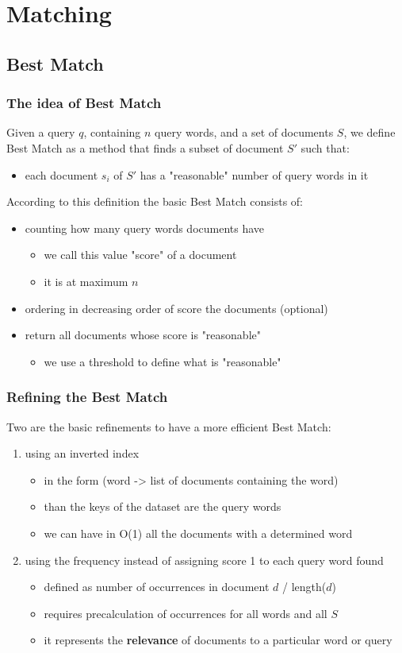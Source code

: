 \documentclass{beamer}
\begin{document}
\section{Matching}
\subsection{Best Match}
\begin{frame}
\frametitle{The idea of Best Match}
Given a query $q$, containing $n$ query words, and a set of documents $S$, we define Best Match as a method that finds a subset of document $S'$ such that:
\begin{itemize}
	\item each document $s_i$ of $S'$ has a "reasonable" number of query words in it
\end{itemize}
\medskip
According to this definition the basic Best Match consists of:
\begin{itemize}
	\item counting how many query words documents have
	\begin{itemize}
		\item we call this value "score" of a document
		\item it is at maximum $n$
	\end{itemize}
	\item ordering in decreasing order of score the documents (optional)
	\item return all documents whose score is "reasonable"
	\begin{itemize}
		\item we use a threshold to define what is "reasonable"
	\end{itemize}
\end{itemize}
\end{frame}
\begin{frame}
\frametitle{Refining the Best Match}
Two are the basic refinements to have a more efficient Best Match:
\begin{enumerate}
	\item using an inverted index
	\begin{itemize}
		\item in the form (word -> list of documents containing the word)
		\item than the keys of the dataset are the query words
		\item we can have in O(1) all the documents with a determined word  
	\end{itemize}
	\item using the frequency instead of assigning score 1 to each query word found
	\begin{itemize}
		\item defined as number of occurrences in document $d$ / length($d$)
		\item requires precalculation of occurrences for all words and all $S$
		\item it represents the \textbf{relevance} of documents to a particular word or query
	\end{itemize}	
\end{enumerate}
\end{frame}
\end{document}
